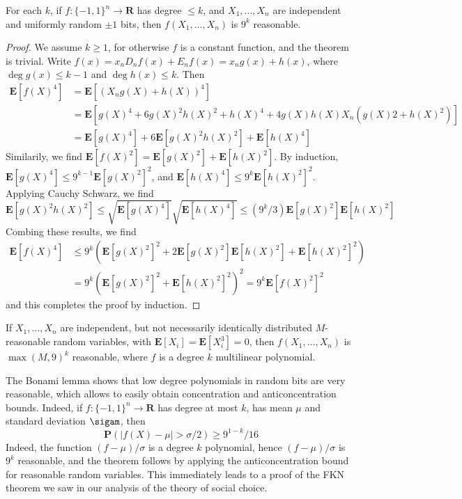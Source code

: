 \begin{lemma}[Bonami]
    For each $k$, if $f: \{ -1, 1 \}^n \to \mathbf{R}$ has degree $\leq k$, and $X_1, \dots, X_n$ are independent and uniformly random $\pm 1$ bits, then $f(X_1, \dots, X_n)$ is $9^k$ reasonable.
\end{lemma}
\begin{proof}
    We assume $k \geq 1$, for otherwise $f$ is a constant function, and the theorem is trivial.  Write $f(x) = x_n D_n f(x) + E_n f(x) = x_n g(x) + h(x)$, where $\deg g(x) \leq k - 1$ and $\deg h(x) \leq k$. Then
    \begin{align*}
        \mathbf{E}[f(X)^4] &= \mathbf{E}[(X_n g(X) + h(X))^4]\\
        &= \mathbf{E}[g(X)^4 + 6 g(X)^2 h(X)^2 + h(X)^4 + 4 g(X) h(X) X_n (g(X)2 + h(X)^2)]\\
        &= \mathbf{E}[g(X)^4] + 6 \mathbf{E}[g(X)^2 h(X)^2] + \mathbf{E}[h(X)^4]
    \end{align*}
    Similarily, we find $\mathbf{E}[f(X)^2] = \mathbf{E}[g(X)^2] + \mathbf{E}[h(X)^2]$. By induction, $\mathbf{E}[g(X)^4] \leq 9^{k-1} \mathbf{E}[g(X)^2]^2$, and $\mathbf{E}[h(X)^4] \leq 9^k \mathbf{E}[h(X)^2]^2$. Applying Cauchy Schwarz, we find
    \[ \mathbf{E}[g(X)^2 h(X)^2] \leq \sqrt{\mathbf{E}[g(X)^4]}\sqrt{\mathbf{E}[h(X)^4]} \leq (9^k/3) \mathbf{E}[g(X)^2] \mathbf{E}[h(X)^2] \]
    Combing these results, we find
    \begin{align*}
        \mathbf{E}[f(X)^4] &\leq 9^k \left( \mathbf{E}[g(X)^2]^2 + 2 \mathbf{E}[g(X)^2] \mathbf{E}[h(X)^2] + \mathbf{E}[h(X)^2]^2 \right)\\
        &= 9^k (\mathbf{E}[g(X)^2]^2 + \mathbf{E}[h(X)^2]^2)^2 = 9^k \mathbf{E}[f(X)^2]^2
    \end{align*}
    and this completes the proof by induction.
\end{proof}

\begin{corollary}
    If $X_1, \dots, X_n$ are independent, but not necessarily identically distributed $M$-reasonable random variables, with $\mathbf{E}[X_i] = \mathbf{E}[X_i^3] = 0$, then $f(X_1, \dots, X_n)$ is $\max(M,9)^k$ reasonable, where $f$ is a degree $k$ multilinear polynomial.
\end{corollary}

The Bonami lemma shows that low degree polynomials in random bits are very reasonable, which allows to easily obtain concentration and anticoncentration bounds. Indeed, if $f: \{ -1, 1 \}^n \to \mathbf{R}$ has degree at most $k$, has mean $\mu$ and standard deviation $\sigam$, then
%
\[ \mathbf{P}(|f(X) - \mu| > \sigma/2) \geq 9^{1-k}/16 \]
%
Indeed, the function $(f - \mu)/\sigma$ is a degree $k$ polynomial, hence $(f - \mu)/\sigma$ is $9^k$ reasonable, and the theorem follows by applying the anticoncentration bound for reasonable random variables. This immediately leads to a proof of the FKN theorem we saw in our analysis of the theory of social choice.

